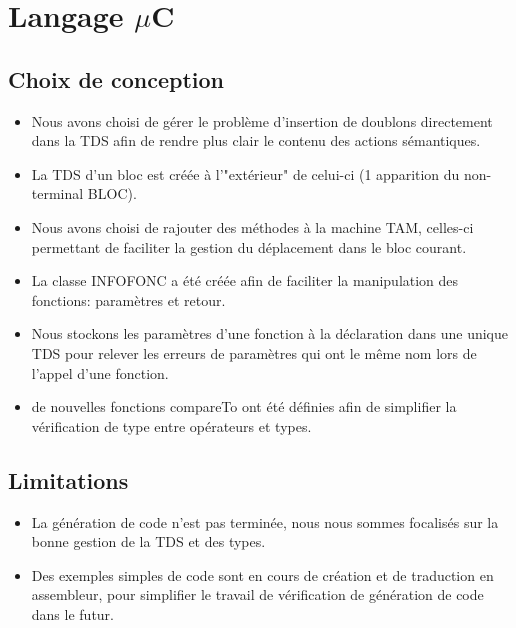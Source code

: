 \documentclass{report}
\begin{document}
\tableofcontents %

\vfill

\part{Langage $\mu$C}

\chapter{Choix de conception}

\begin{itemize}
	\item Nous avons choisi de gérer le problème d'insertion de doublons directement dans la TDS afin de rendre plus clair le contenu des actions sémantiques.
	\item La TDS d'un bloc est créée à l'"extérieur" de celui-ci (1\iere{} apparition du non-terminal BLOC).
	\item Nous avons choisi de rajouter des méthodes à la machine TAM, celles-ci permettant de faciliter la gestion du déplacement dans le bloc courant.
	\item La classe INFOFONC a été créée afin de faciliter la manipulation des fonctions: paramètres et retour.
	\item Nous stockons les paramètres d'une fonction à la déclaration dans une unique TDS pour relever les erreurs de paramètres qui ont le même nom lors de l'appel d'une fonction.
	\item de nouvelles fonctions compareTo ont été définies afin de simplifier la vérification de type entre opérateurs et types.  
\end{itemize}

\chapter{Limitations}
\begin{itemize}
	\item La génération de code n'est pas terminée, nous nous sommes focalisés sur la bonne gestion de la TDS et des types.
	\item Des exemples simples de code sont en cours de création et de traduction en assembleur, pour simplifier le travail de vérification de génération de code dans le futur.
	
\end{itemize}
\end{document}
